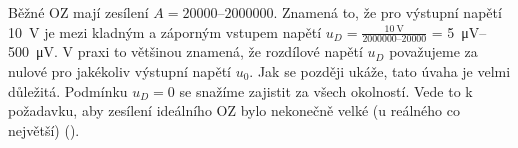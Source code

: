 \begin{mdframed}[style=mdexam]
  \begin{example}\label{aes:exam004}
    Běžné OZ mají zesílení \(A = \numrange{20000}{2000000}\). Znamená to, že pro výstupní napětí
    \SI{10}{\V} je mezi kladným a záporným vstupem napětí \(u_D
    =\frac{\SI{10}{\V}}{\numrange{2000000}{20000}}\) = \SIrange{5}{500}{\uV}. V praxi to většinou
    znamená, že rozdílové napětí \(u_D\) považujeme za nulové pro jakékoliv výstupní napětí \(u_0\).
    Jak se později ukáže, tato úvaha je velmi důležitá. Podmínku \(u_D = 0\) se snažíme zajistit za
    všech okolností. Vede to k požadavku, aby zesílení ideálního OZ bylo nekonečně velké (u reálného
    co největší) (\cite[s.~14]{Puncochar1996}).    
  \end{example}
\end{mdframed}